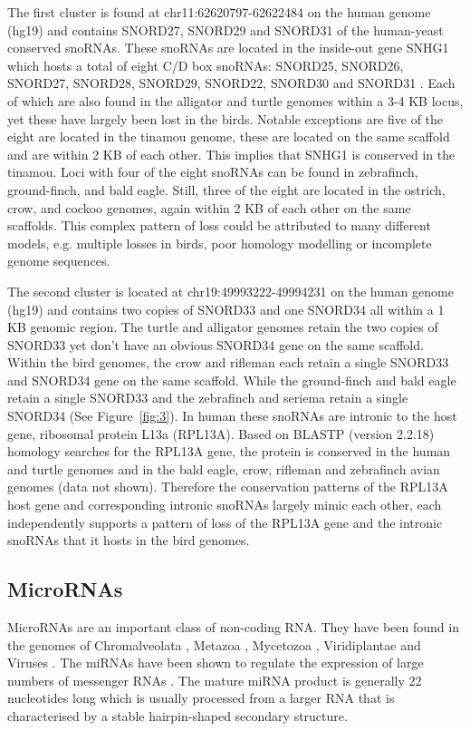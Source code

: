 \documentclass[10pt]{bmc_article}
\newenvironment{bmcformat}{\begin{raggedright}\baselineskip20pt\sloppy\setboolean{publ}{false}}{\end{raggedright}\baselineskip20pt\sloppy}
\begin{document}
\begin{bmcformat}
The first cluster is found at chr11:62620797-62622484 on the human
genome (hg19) and contains SNORD27, SNORD29 and SNORD31 of the
human-yeast conserved snoRNAs. These snoRNAs are located in the
inside-out gene SNHG1 which hosts a total of eight C/D box snoRNAs:
SNORD25, SNORD26, SNORD27, SNORD28, SNORD29, SNORD22, SNORD30 and
SNORD31 \cite{Tycowski:1996}. Each of which are also found in the
alligator and turtle genomes within a 3-4 KB locus, yet these have
largely been lost in the birds. Notable exceptions are five of the
eight are located in the tinamou genome, these are located on the same
scaffold and are within 2 KB of each other. This implies that SNHG1 is
conserved in the tinamou. Loci with four of the eight snoRNAs can be
found in zebrafinch, ground-finch, and bald eagle. Still, three of the
eight are located in the ostrich, crow, and cockoo genomes, again
within 2 KB of each other on the same scaffolds. This complex pattern
of loss could be attributed to many different models, e.g. multiple
losses in birds, poor homology modelling or incomplete genome
sequences.


The second cluster is located at chr19:49993222-49994231 on the human
genome (hg19) and contains two copies of SNORD33 and one SNORD34 all
within a 1 KB genomic region. The turtle and alligator genomes retain
the two copies of SNORD33 yet don't have an obvious SNORD34 gene on
the same scaffold. Within the bird genomes, the crow and rifleman each
retain a single SNORD33 and SNORD34 gene on the same scaffold. While
the ground-finch and bald eagle retain a single SNORD33 and the
zebrafinch and seriema retain a single SNORD34 (See
Figure~\ref{fig:3}).  In human these snoRNAs are intronic to the host
gene, ribosomal protein L13a (RPL13A). Based on BLASTP (version
2.2.18) homology searches for the RPL13A gene, the protein is
conserved in the human and turtle genomes and in the bald eagle, crow,
rifleman and zebrafinch avian genomes (data not shown). Therefore the
conservation patterns of the RPL13A host gene and corresponding
intronic snoRNAs largely mimic each other, each independently supports
a pattern of loss of the RPL13A gene and the intronic snoRNAs that it
hosts in the bird genomes.


\subsection*{MicroRNAs}
MicroRNAs are an important class of non-coding RNA. They have been
found in the genomes of Chromalveolata \cite{Cock:2010,Huang:2011},
Metazoa \cite{Lee:1993,Lau:2001,Hertel:2006}, Mycetozoa
\cite{Hinas:2007,Avesson:2012}, Viridiplantae
\cite{Reinhart:2002,Fattash:2007,Axtell:2007,Molnar:2007} and Viruses
\cite{Pfeffer:2004,Ouellet:2008,Pfeffer:2005,Landgraf:2007}. The
miRNAs have been shown to regulate the expression of large numbers of
messenger RNAs \cite{Lim:2005}. The mature miRNA product is generally
22 nucleotides long which is usually processed from a larger RNA that
is characterised by a stable hairpin-shaped secondary structure.


\end{bmcformat}
\end{document}
